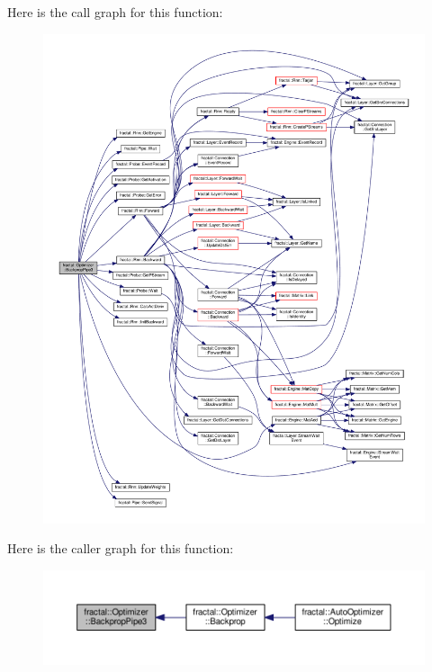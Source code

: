 Here is the call graph for this function\+:\nopagebreak
\begin{figure}[H]
\begin{center}
\leavevmode
\includegraphics[width=350pt]{d8/ddf/classfractal_1_1Optimizer_a220eb53debdc9adc8462f993113da58d_cgraph}
\end{center}
\end{figure}




Here is the caller graph for this function\+:\nopagebreak
\begin{figure}[H]
\begin{center}
\leavevmode
\includegraphics[width=350pt]{d8/ddf/classfractal_1_1Optimizer_a220eb53debdc9adc8462f993113da58d_icgraph}
\end{center}
\end{figure}


